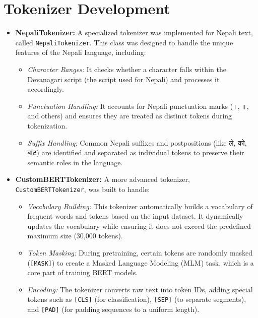 \section{Tokenizer Development}
\begin{itemize}
    \item \textbf{NepaliTokenizer:} A specialized tokenizer was implemented for Nepali text, called \texttt{NepaliTokenizer}. This class was designed to handle the unique features of the Nepali language, including:
    \begin{itemize}
        \item \textit{Character Ranges:} It checks whether a character falls within the Devanagari script (the script used for Nepali) and processes it accordingly.
        \item \textit{Punctuation Handling:} It accounts for Nepali punctuation marks (\textsanskrit{।}, \textsanskrit{॥}, and others) and ensures they are treated as distinct tokens during tokenization.
        \item \textit{Suffix Handling:} Common Nepali suffixes and postpositions (like \textsanskrit{ले}, \textsanskrit{को}, \textsanskrit{बाट}) are identified and separated as individual tokens to preserve their semantic roles in the language.
    \end{itemize}
    \item \textbf{CustomBERTTokenizer:} A more advanced tokenizer, \texttt{CustomBERTTokenizer}, was built to handle:
    \begin{itemize}
        \item \textit{Vocabulary Building:} This tokenizer automatically builds a vocabulary of frequent words and tokens based on the input dataset. It dynamically updates the vocabulary while ensuring it does not exceed the predefined maximum size (30,000 tokens).
        \item \textit{Token Masking:} During pretraining, certain tokens are randomly masked (\texttt{[MASK]}) to create a Masked Language Modeling (MLM) task, which is a core part of training BERT models.
        \item \textit{Encoding:} The tokenizer converts raw text into token IDs, adding special tokens such as \texttt{[CLS]} (for classification), \texttt{[SEP]} (to separate segments), and \texttt{[PAD]} (for padding sequences to a uniform length).
    \end{itemize}
\end{itemize}

